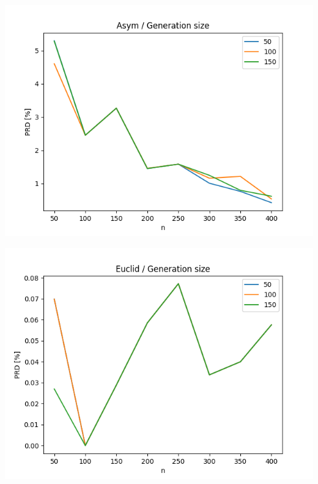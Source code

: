 \documentclass{article}
\begin{document}
\begin{center}
\includegraphics[width=\textwidth, 
                   height = 0.4\textheight, 
                   keepaspectratio]
                  {plots/asym_3_generation_size} 
\end{center}

\begin{center}
\includegraphics[width=\textwidth, 
                   height = 0.4\textheight, 
                   keepaspectratio]
                  {plots/euclid_3_generation_size} 
\end{center}
\end{document}
